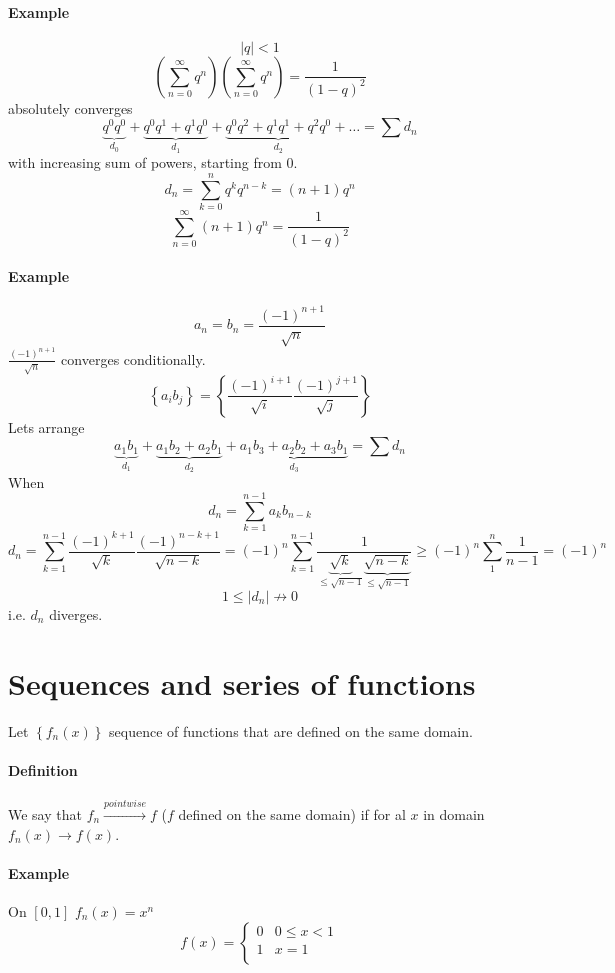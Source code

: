 \paragraph{Example}
$$|q|<1$$
$$\left(\sum_{n=0}^{\infty} q^n\right)\left(\sum_{n=0}^{\infty} q^n\right) = \frac{1}{\left(1-q\right)^2}$$
absolutely converges
$$\underbrace{q^0q^0}_{d_0} + \underbrace{q^0q^1+ q^1q^0}_{d_1}+ \underbrace{q^0q^2 + q^1q^1 + q^2q^0}_{d_2} + \dots = \sum d_n$$
with increasing sum of powers, starting from 0.
$$d_n = \sum_{k=0}^{n} q^k q^{n-k} = (n+1)q^n$$
$$\sum_{n=0}^\infty (n+1)q^n = \frac{1}{(1-q)^2}$$

\paragraph{Example}
$$a_n =b_n = \frac{(-1)^{n+1}}{\sqrt{n}}$$ 
$\frac{(-1)^{n+1}}{\sqrt{n}}$ converges conditionally. 
$$\left\{a_ib_j\right\} = \left\{ \frac{(-1)^{i+1}}{\sqrt{i}} \frac{(-1)^{j+1}}{\sqrt{j}} \right\}$$
Lets arrange 
$$\underbrace{a_1b_1}_{d_1} + \underbrace{a_1b_2 + a_2b_1}_{d_2}  + \underbrace{a_1b_3 + a_2b_2 + a_3b_1}_{d_3} = \sum d_n $$
When $$d_n = \sum_{k=1}^{n-1} a_kb_{n-k}$$
$$d_n = \sum_{k=1}^{n-1} \frac{(-1)^{k+1}}{\sqrt{k}}\frac{(-1)^{n-k+1}}{\sqrt{n-k}} = (-1)^n\sum_{k=1}^{n-1} \frac{1}{\underbrace{\sqrt{k}}_{\leq \sqrt{n-1}}\underbrace{\sqrt{n-k}}_{\leq \sqrt{n-1}}} \geq (-1)^n \sum_1^n \frac{1}{n-1} = (-1)^n$$
	$$1\leq |d_n| \not\to 0 $$
	i.e. $d_n$ diverges.
	
\section{Sequences and series of functions}
Let $\left\{ f_n(x) \right\}$ sequence of functions that are defined on the same domain.
\paragraph{Definition} We say that $f_n \stackrel{pointwise}{\longrightarrow} f$ ($f$ defined on the same domain) if for al $x$ in domain $f_n(x) \to f(x)$.
\paragraph{Example}
On $[0,1]$ $f_n(x) = x^n$ 
$$f(x) = \begin{cases}
0 & 0 \leq x< 1\\1& x=1\\
\end{cases}$$